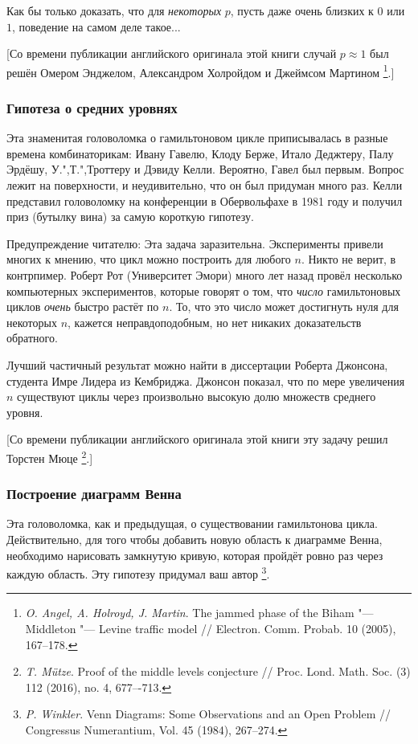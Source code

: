 \documentclass[twoside]{book}
\begin{document}
Как бы только доказать, что для \emph{некоторых} $p$, пусть даже очень близких к $0$ или $1$, поведение на самом деле такое...

[Со времени публикации английского оригинала этой книги случай $p\approx 1$ был решён Омером Энджелом,
Александром Холройдом и Джеймсом Мартином%
\footnote{\emph{O. Angel, A. Holroyd, J. Martin}. 
The jammed phase of the Biham "--- Middleton "--- Levine traffic model /\!/
{Electron. Comm. Probab.} 10 (2005), 167--178.}.]

\subsubsection*{Гипотеза о средних уровнях}

Эта знаменитая головоломка о гамильтоновом цикле приписывалась в разные времена комбинаторикам: Ивану Гавелю, Клоду Берже, Итало Деджтеру, Палу Эрдёшу, У.",Т.",Троттеру и Дэвиду Келли.
Вероятно, Гавел был первым.
Вопрос лежит на поверхности, и неудивительно, что он был придуман много раз.
Келли представил головоломку на конференции в Обервольфахе в 1981 году и получил приз (бутылку вина) за самую короткую гипотезу.


Предупреждение читателю:
Эта задача заразительна. 
Эксперименты привели многих к мнению, что цикл можно построить для любого $n$.
Никто не верит, в контрпимер.
Роберт Рот (Университет Эмори) много лет назад провёл несколько компьютерных экспериментов, которые говорят о том, что \emph{число} гамильтоновых циклов \emph{очень} быстро растёт по $n$.
То, что это число может достигнуть нуля для некоторых $n$, кажется неправдоподобным, но нет никаких доказательств обратного.

Лучший частичный результат можно найти в диссертации Роберта Джонсона, студента Имре Лидера из Кембриджа.
Джонсон показал, что по мере увеличения $n$ существуют циклы через произвольно высокую долю множеств среднего уровня.

[Со времени публикации английского оригинала этой книги эту задачу решил Торстен Мюце
\footnote{\emph{T. Mütze}. 
Proof of the middle levels conjecture /\!/
{Proc. Lond. Math. Soc.} (3) 112 (2016), no. 4, 677–-713.}.]

\subsubsection*{Построение диаграмм Венна}

Эта головоломка, как и предыдущая, о существовании гамильтонова цикла. 
Действительно, для того чтобы добавить новую область к диаграмме Венна, необходимо нарисовать замкнутую кривую, которая пройдёт ровно раз через каждую область.
Эту гипотезу придумал ваш автор%
\footnote{\emph{P. Winkler}. Venn Diagrams: Some Observations and an Open Problem /\!/ {Congressus Numerantium}, Vol. 45 (1984), 267--274.}.
\end{document}
